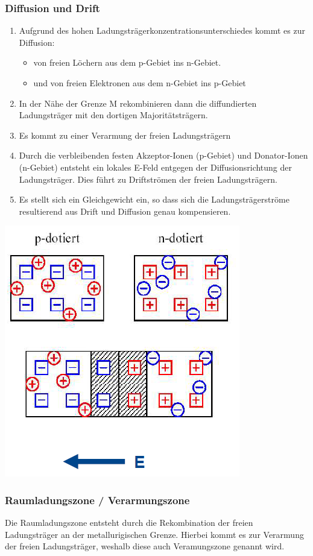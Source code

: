  	\subsubsection{Diffusion und Drift}
 		\begin{enumerate}
 			\item Aufgrund des hohen Ladungsträgerkonzentrationsunterschiedes
 			kommt es zur Diffusion:
 			\begin{itemize}
 				\item von freien Löchern aus dem p-Gebiet ins n-Gebiet.
 				\item und von freien Elektronen aus dem n-Gebiet ins p-Gebiet
 			\end{itemize}
 			\item In der Nähe der Grenze M rekombinieren dann die diffundierten Ladungsträger mit den dortigen Majoritätsträgern.
 			\item Es kommt zu einer Verarmung der freien Ladungsträgern
 			\item Durch die verbleibenden festen Akzeptor-Ionen (p-Gebiet) und Donator-Ionen (n-Gebiet) entsteht ein lokales E-Feld entgegen der Diffusionsrichtung der Ladungsträger. Dies führt zu Driftströmen der freien Ladungsträgern.
 			\item Es stellt sich ein Gleichgewicht ein, so dass sich die Ladungsträgerströme resultierend aus Drift und Diffusion genau kompensieren.
 		\end{enumerate}
		 \begin{center}
		 	\includegraphics[width=0.4\linewidth]{Kapitel/Kap08/driftUndDiffusion}
		 \end{center}

	\subsubsection{Raumladungszone / Verarmungszone}
		Die Raumladungszone entsteht durch die Rekombination der freien Ladungsträger an der metallurigischen Grenze. Hierbei kommt es zur Verarmung der freien Ladungsträger, weshalb diese auch Veramungszone genannt wird. 
